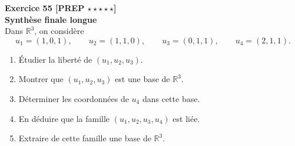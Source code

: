 \documentclass[11pt,a4paper]{article}
\begin{document}
\textbf{Exercice 55 [PREP $\star\star\star\star\star$]}\\
\textbf{Synthèse finale longue}\\
Dans \(\mathbb{R}^3\), on considère
\[
u_1=(1,0,1),\qquad u_2=(1,1,0),\qquad u_3=(0,1,1),\qquad u_4=(2,1,1).
\]
\begin{enumerate}[label=\alph*)]
    \item Étudier la liberté de \((u_1,u_2,u_3)\).
    \item Montrer que \((u_1,u_2,u_3)\) est une base de \(\mathbb{R}^3\).
    \item Déterminer les coordonnées de \(u_4\) dans cette base.
    \item En déduire que la famille \((u_1,u_2,u_3,u_4)\) est liée.
    \item Extraire de cette famille une base de \(\mathbb{R}^3\).
\end{enumerate}
\end{document}
